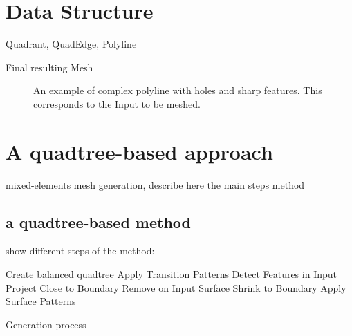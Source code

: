 \documentclass[10pt]{article}
\begin{document}
\section{Data Structure}
\label{sec:dataStruct}

Quadrant, QuadEdge, Polyline

Final resulting Mesh

 \begin{figure}[htb]
\centering
\caption{An example of complex polyline with holes and sharp features. This corresponds to the Input to be meshed.}
\label{fig:boundary}
\end{figure}


\section{A quadtree-based approach}
\label{sec:method}

mixed-elements mesh generation, describe here the main steps method

\subsection{a quadtree-based method}
show different steps of the method: 

\begin{algorithm}[H]



\SetAlgoLined
{}
 \nl {}
 \nl Create balanced quadtree\; \label{alg:goto}
 \nl Apply Transition Patterns\;
 \nl Detect Features in Input\;
 Project Close to Boundary\;
 Remove on Input Surface\;
 Shrink to Boundary\;
 \nl Apply Surface Patterns\;
 \caption{Generation process}
 \label{alg:generate}
\end{algorithm}
\end{document}
